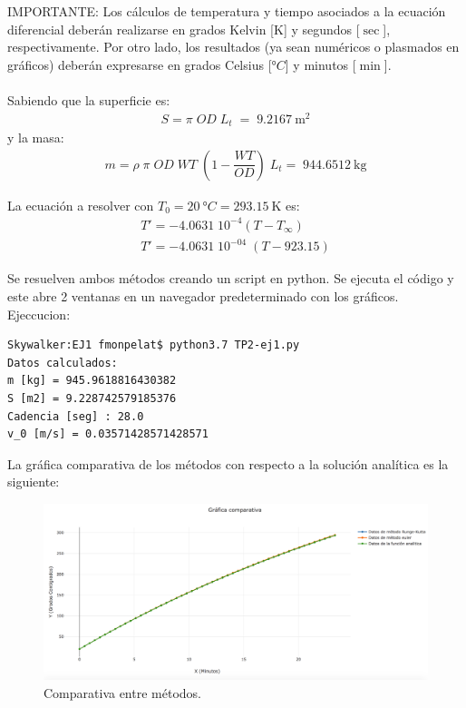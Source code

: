 \documentclass[10pt,a4paper]{article}
\begin{document}
IMPORTANTE: Los cálculos de temperatura y tiempo asociados a la ecuación diferencial deberán realizarse en grados Kelvin [$\si{\kelvin}$] y segundos [$\si{\sec}$], respectivamente. Por otro lado, los resultados (ya sean numéricos o plasmados en gráficos) deberán expresarse en grados Celsius [$\si{\degree C}$] y minutos [$\si{\min}$].\\
\\
Sabiendo que la superficie es:
\begin{equation}
\begin{split}
\nonumber S = \pi\;OD\;L_{t}\;=\;\SI{9.2167}{\meter^2}
\end{split}
\end{equation}
y la masa:
\begin{equation}
\begin{split}
\nonumber m = \rho\;\pi\;OD\;WT\;(1-\dfrac{WT}{OD})\;L_{t}=\;\SI{944.6512}{\kg}
\end{split}
\end{equation}

\newcommand\masa{944.6512}
\newcommand\superficie{9.2167}

\newcommand\tone{650}
\newcommand\ttwo{650}

La ecuación a resolver con $T_{0}=\SI{20}{\degree C}=\SI{293.15}{\kelvin}$ es:
\begin{equation}
\begin{split}
T'=-4.0631\;10^{-4}(T-T_{\infty})\\
T'=-4.0631\;10^{-04}\;(T-923.15)
\end{split}
\end{equation}

Se resuelven ambos métodos creando un script en python. Se ejecuta el código y este abre 2 ventanas en un navegador predeterminado con los gráficos.\\
Ejeccucion:
\begin{verbatim}
Skywalker:EJ1 fmonpelat$ python3.7 TP2-ej1.py
Datos calculados: 
m [kg] = 945.9618816430382
S [m2] = 9.228742579185376
Cadencia [seg] : 28.0
v_0 [m/s] = 0.03571428571428571
\end{verbatim}

La gráfica comparativa de los métodos con respecto a la solución analítica es la siguiente: 
\begin{figure}[H]
\centering
\includegraphics[width=15cm]{Grafica-ej1.png}
\caption{Comparativa entre métodos.}
\end{figure}
\end{document}
